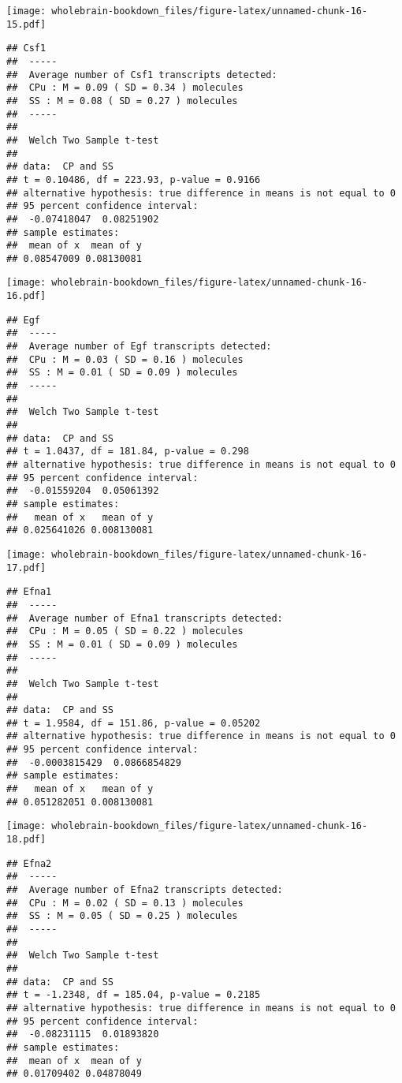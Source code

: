 \documentclass[]{book}
\theoremstyle{definition}
\theoremstyle{definition}
\theoremstyle{remark}
\begin{document}
\texttt{[image: wholebrain-bookdown\_files/figure-latex/unnamed-chunk-16-15.pdf]}

\begin{verbatim}
## Csf1
##  -----
##  Average number of Csf1 transcripts detected:
##  CPu : M = 0.09 ( SD = 0.34 ) molecules 
##  SS : M = 0.08 ( SD = 0.27 ) molecules
##  -----
## 
##  Welch Two Sample t-test
## 
## data:  CP and SS
## t = 0.10486, df = 223.93, p-value = 0.9166
## alternative hypothesis: true difference in means is not equal to 0
## 95 percent confidence interval:
##  -0.07418047  0.08251902
## sample estimates:
##  mean of x  mean of y 
## 0.08547009 0.08130081
\end{verbatim}

\texttt{[image: wholebrain-bookdown\_files/figure-latex/unnamed-chunk-16-16.pdf]}

\begin{verbatim}
## Egf
##  -----
##  Average number of Egf transcripts detected:
##  CPu : M = 0.03 ( SD = 0.16 ) molecules 
##  SS : M = 0.01 ( SD = 0.09 ) molecules
##  -----
## 
##  Welch Two Sample t-test
## 
## data:  CP and SS
## t = 1.0437, df = 181.84, p-value = 0.298
## alternative hypothesis: true difference in means is not equal to 0
## 95 percent confidence interval:
##  -0.01559204  0.05061392
## sample estimates:
##   mean of x   mean of y 
## 0.025641026 0.008130081
\end{verbatim}

\texttt{[image: wholebrain-bookdown\_files/figure-latex/unnamed-chunk-16-17.pdf]}

\begin{verbatim}
## Efna1
##  -----
##  Average number of Efna1 transcripts detected:
##  CPu : M = 0.05 ( SD = 0.22 ) molecules 
##  SS : M = 0.01 ( SD = 0.09 ) molecules
##  -----
## 
##  Welch Two Sample t-test
## 
## data:  CP and SS
## t = 1.9584, df = 151.86, p-value = 0.05202
## alternative hypothesis: true difference in means is not equal to 0
## 95 percent confidence interval:
##  -0.0003815429  0.0866854829
## sample estimates:
##   mean of x   mean of y 
## 0.051282051 0.008130081
\end{verbatim}

\texttt{[image: wholebrain-bookdown\_files/figure-latex/unnamed-chunk-16-18.pdf]}

\begin{verbatim}
## Efna2
##  -----
##  Average number of Efna2 transcripts detected:
##  CPu : M = 0.02 ( SD = 0.13 ) molecules 
##  SS : M = 0.05 ( SD = 0.25 ) molecules
##  -----
## 
##  Welch Two Sample t-test
## 
## data:  CP and SS
## t = -1.2348, df = 185.04, p-value = 0.2185
## alternative hypothesis: true difference in means is not equal to 0
## 95 percent confidence interval:
##  -0.08231115  0.01893820
## sample estimates:
##  mean of x  mean of y 
## 0.01709402 0.04878049
\end{verbatim}
\end{document}
